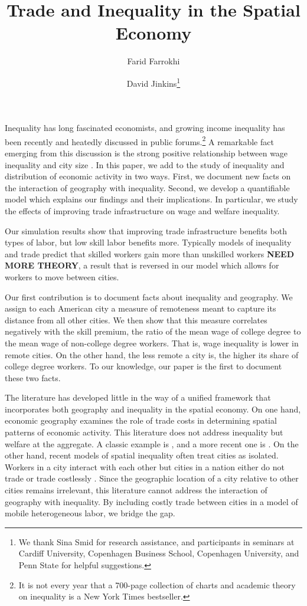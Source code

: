 \documentclass[12 pt]{article}
\title{Trade and Inequality in the Spatial Economy}
\author[1]{Farid Farrokhi}
\author[2]{David Jinkins\thanks{We thank Sina Smid for research assistance, and participants in seminars at Cardiff University, Copenhagen Business School, Copenhagen University, and Penn State for helpful suggestions.}}
\affil[1]{Penn State}
\affil[2]{Copenhagen Business School}
\begin{document}
\maketitle

Inequality has long fascinated economists, and growing income inequality has been recently and heatedly discussed in public forums.\footnote{It is not every year that a 700-page collection of charts and academic theory on inequality is a New York Times bestseller.} A remarkable fact emerging from this discussion is the strong positive relationship between wage inequality and city size \citep{baum2012understanding}.  In this paper, we add to the study of inequality and distribution of economic activity in two ways. First, we document new facts on the interaction of geography with inequality. Second, we develop a quantifiable model which explains our findings and their implications. In particular, we study the effects of improving trade infrastructure on wage and welfare inequality.

Our simulation results show that improving trade infrastructure benefits both types of labor, but low skill labor benefits more.  Typically models of inequality and trade predict that skilled workers gain more than unskilled workers \citep{hummels2014wage} \textbf{NEED MORE THEORY}, a result that is reversed in our model which allows for workers to move between cities.

Our first contribution is to document facts about inequality and geography.  We assign to each American city a measure of remoteness meant to capture its distance from all other cities.  We then show that this measure correlates negatively with the skill premium, the ratio of the mean wage of college degree to the mean wage of non-college degree workers. That is, wage inequality is lower in remote cities. On the other hand, the less remote a city is, the higher its share of college degree workers. To our knowledge, our paper is the first to document these two facts.

The literature has developed little in the way of a unified framework that incorporates both geography and inequality in the spatial economy. On one hand, economic geography examines the role of trade costs in determining spatial patterns of economic activity. This literature does not address inequality but welfare at the aggregate.  A classic example is \citep{krugman1991increasing}, and a more recent one is \citet{allen2014trade}. On the other hand, recent models of spatial inequality often treat cities as isolated. Workers in a city interact with each other but cities in a nation either do not trade or trade costlessly \citep{davis2014comparative}. Since the geographic location of a city relative to other cities remains irrelevant, this literature cannot address the interaction of geography with inequality. By including costly trade between cities in a model of mobile heterogeneous labor, we bridge the gap.
\end{document}
